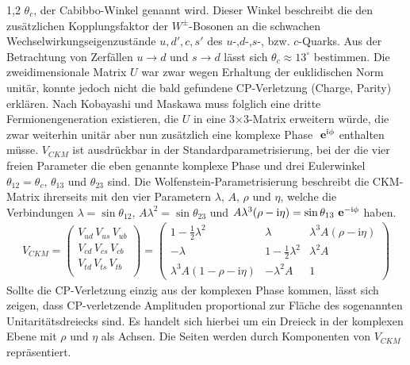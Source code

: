 \documentclass[11pt,a4paper,twoside]{report}
\begin{document}
\begin{spacing}{1,2}
$\theta_c$, der Cabibbo-Winkel genannt wird. Dieser Winkel beschreibt die den zusätzlichen Kopplungsfaktor der $W^\pm$-Bosonen an die schwachen 
Wechselwirkungseigenzustände $u, d', c, s'$ des $u$-,$d$-,$s$-, bzw. $c$-Quarks. Aus der Betrachtung von Zerfällen $u\rightarrow d$ und $s\rightarrow d$ lässt
sich $\theta_c \approx 13^\circ$ bestimmen. Die zweidimensionale Matrix $U$ war zwar wegen Erhaltung der euklidischen Norm unitär, konnte jedoch nicht die 
bald gefundene CP-Verletzung (Charge, Parity) erklären. Nach Kobayashi und Maskawa muss folglich eine dritte Fermionengeneration existieren,
die $U$ in eine 3$\times$3-Matrix erweitern würde, die zwar weiterhin unitär aber nun zusätzlich eine komplexe Phase $\ \mathbf{e}^{\text{i}\phi}$ enthalten müsse. $V_{CKM}$ ist
ausdrückbar in der Standardparametrisierung, bei der die vier freien Parameter die eben genannte komplexe Phase und drei Eulerwinkel 
$\theta_{12} = \theta_c,\, \theta_{13}$ und $\theta_{23}$ sind. Die Wolfenstein-Parametrisierung beschreibt die CKM-Matrix ihrerseits mit den vier Parametern
$\lambda,\, A,\, \rho$ und $\eta$, welche die Verbindungen $\lambda = \sin\theta_{12},\, A\lambda^2 = \sin\theta_{23}$ und $A\lambda^3(\rho-\text{i}\eta) = \sin\theta_{13}\ \mathbf{e}^{-\text{i}\phi}$
haben.
\begin{align}
 V_{CKM} = \begin{pmatrix}
            V_{ud}\,V_{us}\,V_{ub}\\
            V_{cd}\,V_{cs}\,V_{cb}\\
            V_{td}\,V_{ts}\,V_{tb}\\
           \end{pmatrix} = \begin{pmatrix}
			    1-\frac12\lambda^2 & \lambda & \lambda^3A(\rho-\text{i}\eta)\\
			    -\lambda & 1-\frac12 \lambda^2 &\lambda^2A\\
			    \lambda^3A(1-\rho-\text{i}\eta) &-\lambda^2A & 1
			    \end{pmatrix}
\end{align}
Sollte die CP-Verletzung einzig aus der komplexen Phase kommen, lässt sich zeigen, dass CP-verletzende Amplituden proportional zur Fläche des sogenannten
Unitaritätsdreiecks sind. Es handelt sich hierbei um ein Dreieck in der komplexen Ebene mit $\rho$ und $\eta$ als Achsen. Die Seiten werden durch Komponenten
von $V_{CKM}$ repräsentiert.


\end{spacing}
\end{document}
